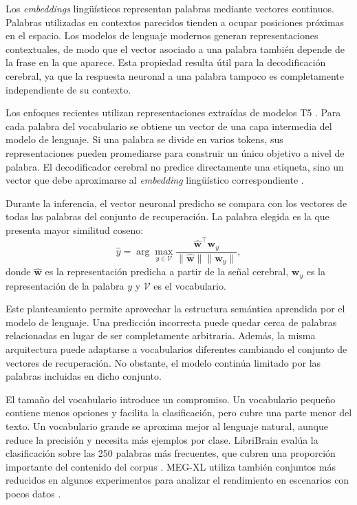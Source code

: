 Los \textit{embeddings} lingüísticos representan palabras mediante vectores continuos. Palabras utilizadas en contextos parecidos tienden a ocupar posiciones próximas en el espacio. Los modelos de lenguaje modernos generan representaciones contextuales, de modo que el vector asociado a una palabra también depende de la frase en la que aparece. Esta propiedad resulta útil para la decodificación cerebral, ya que la respuesta neuronal a una palabra tampoco es completamente independiente de su contexto.

Los enfoques recientes utilizan representaciones extraídas de modelos T5 \cite{raffel2020t5}. Para cada palabra del vocabulario se obtiene un vector de una capa intermedia del modelo de lenguaje. Si una palabra se divide en varios tokens, sus representaciones pueden promediarse para construir un único objetivo a nivel de palabra. El decodificador cerebral no predice directamente una etiqueta, sino un vector que debe aproximarse al \textit{embedding} lingüístico correspondiente \cite{dascoli2024words,ozdogan2025libribrain}.

Durante la inferencia, el vector neuronal predicho se compara con los vectores de todas las palabras del conjunto de recuperación. La palabra elegida es la que presenta mayor similitud coseno:
\[
    \hat{y} =
    \arg\max_{y \in \mathcal{V}}
    \frac{\hat{\mathbf{w}}^{\top}\mathbf{w}_{y}}
    {\lVert\hat{\mathbf{w}}\rVert
     \lVert\mathbf{w}_{y}\rVert},
\]
donde \(\hat{\mathbf{w}}\) es la representación predicha a partir de la señal cerebral, \(\mathbf{w}_{y}\) es la representación de la palabra \(y\) y \(\mathcal{V}\) es el vocabulario.

Este planteamiento permite aprovechar la estructura semántica aprendida por el modelo de lenguaje. Una predicción incorrecta puede quedar cerca de palabras relacionadas en lugar de ser completamente arbitraria. Además, la misma arquitectura puede adaptarse a vocabularios diferentes cambiando el conjunto de vectores de recuperación. No obstante, el modelo continúa limitado por las palabras incluidas en dicho conjunto.

El tamaño del vocabulario introduce un compromiso. Un vocabulario pequeño contiene menos opciones y facilita la clasificación, pero cubre una parte menor del texto. Un vocabulario grande se aproxima mejor al lenguaje natural, aunque reduce la precisión y necesita más ejemplos por clase. LibriBrain evalúa la clasificación sobre las 250 palabras más frecuentes, que cubren una proporción importante del contenido del corpus \cite{ozdogan2025libribrain}. MEG-XL utiliza también conjuntos más reducidos en algunos experimentos para analizar el rendimiento en escenarios con pocos datos \cite{jayalath2026megxl}.

